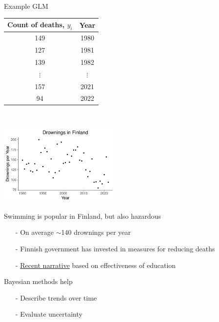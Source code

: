 \documentclass[finnish,english,t]{beamer}
\begin{document}
\begin{frame}{Example GLM}

{\footnotesize\vspace{-1mm}
    \begin{tabular}{c c}
      \vspace{-1mm} Count of deaths, $y_i$ & Year \\
      \hline \vspace{-1mm}
      149 & 1980 \\ \vspace{-1mm}
      127 & 1981 \\ \vspace{-1mm}
      139 & 1982 \\ \vspace{-1mm}
       $\vdots$ & $\vdots$ \\ \vspace{-1mm}
       157 & 2021 \\ \vspace{-1mm}
       94 & 2022
       
    \end{tabular}
  }~\parbox[t][2cm][b]{3.5cm}{\includegraphics[width=6cm]{slides/figs/drownings_plot.pdf}}
  \vspace{2mm}
  \pause

  \vspace{-\baselineskip}
  Swimming is popular in Finland, but also hazardous 
    \begin{itemize}
      \item[-] On average $\sim$140 drownings per year
      \item[-] Finnish government has invested in measures for reducing deaths
      \item[-] \href{https://yle.fi/a/74-20048960}{Recent narrative} based on effectiveness of education 
      \end{itemize}
      
  \pause
   Bayesian methods help
    \begin{itemize}
    \item[-] Describe trends over time
    \item[-] Evaluate uncertainty
    \end{itemize}

\end{frame}
\end{document}
